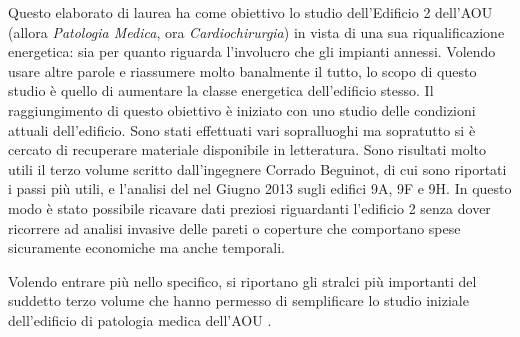 Questo elaborato di laurea ha come obiettivo lo studio dell'Edificio 2 dell'AOU \uni{} (allora \emph{Patologia Medica}, ora \emph{Cardiochirurgia}) in vista di una sua riqualificazione energetica: sia per quanto riguarda l'involucro che gli impianti annessi. Volendo usare altre parole e riassumere molto banalmente il tutto, lo scopo di questo studio è quello di aumentare la classe energetica dell'edificio stesso. Il raggiungimento di questo obiettivo è iniziato con uno studio delle condizioni attuali dell'edificio. Sono stati effettuati vari sopralluoghi ma sopratutto si è cercato di recuperare materiale disponibile in letteratura. Sono risultati molto utili il terzo volume scritto dall'ingegnere Corrado Beguinot, di cui sono riportati i passi più utili, e l'analisi del  nel Giugno 2013 sugli edifici 9A, 9F e 9H. In questo modo è stato possibile ricavare dati preziosi riguardanti l'edificio 2 senza dover ricorrere ad analisi invasive delle pareti o coperture che comportano spese sicuramente economiche ma anche temporali.

Volendo entrare più nello specifico, si riportano gli stralci più importanti del suddetto terzo volume che hanno permesso di semplificare lo studio iniziale dell'edificio di patologia medica dell'AOU \uni. 

